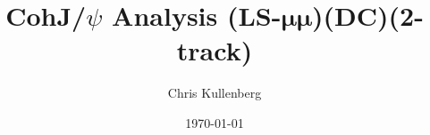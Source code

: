 \title{CohJ/$\psi$ Analysis (\textbf{LS}-$\boldsymbol{\mu\mu}$)(\textbf{DC})(\textbf{2-track})}
\author{Chris Kullenberg}
\date{\today}
